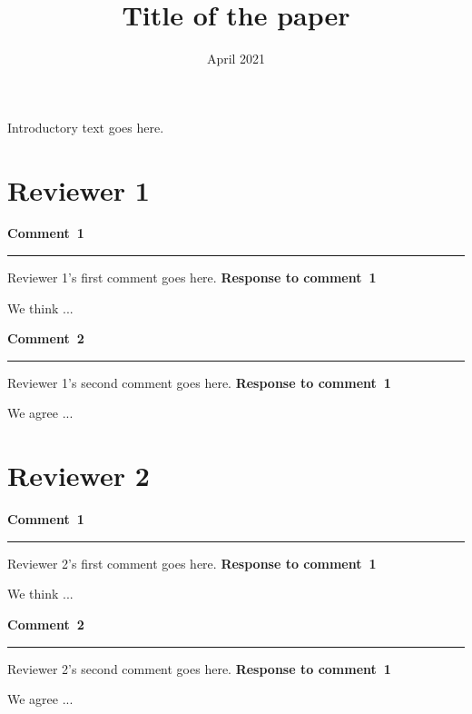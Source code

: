 \documentclass{article}
\title{Title of the paper}
\date{April 2021}
\newenvironment{comment}[1][]
{%
    \newcommand{\response}{%
        \newline
        \newline
        \textbf{Response to comment~#1}
        \newline
    }%
    \par\medskip
    \noindent \textbf{Comment~#1}
    \newline\noindent\rule{12cm}{0.4pt}
    \newline
}
{%
    \medskip
}
\begin{document}
\maketitle

Introductory text goes here.

\section*{Reviewer 1}

\begin{comment}[1]
Reviewer 1's first comment goes here.
%
\response
%
We think ...
\end{comment}

\begin{comment}[2]
Reviewer 1's second comment goes here.
%
\response
%
We agree ...
\end{comment}


\section*{Reviewer 2}

\begin{comment}[1]
Reviewer 2's first comment goes here.
%
\response
%
We think ...
\end{comment}

\begin{comment}[2]
Reviewer 2's second comment goes here.
%
\response
%
We agree ...
\end{comment}
\end{document}
